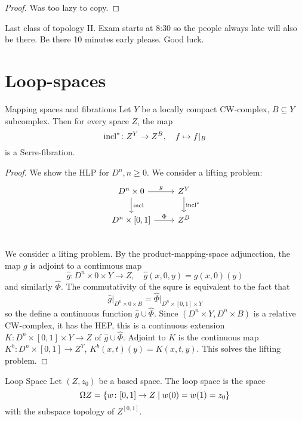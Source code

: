 \documentclass[language=english]{TemplateLecture}
\begin{document}
\begin{proof}
    Was too lazy to copy.
\end{proof}

Last class of topology II. Exam starts at 8:30 so the people always late will also be there. Be there 10 minutes early please. Good luck.

\section{Loop-spaces}

\begin{thm}{Mapping spaces and fibrations}{}
    Let \(Y\) be a locally compact CW-complex, \(B\subseteq Y\) subcomplex. Then for every space \(Z\), the map
    \[\operatorname{incl}^*\colon Z^Y \to Z^B, \quad f \mapsto f\rvert_B\]
    is a Serre-fibration.
\end{thm}

\begin{proof}
    We show the HLP for \(D^n, n \geq 0\). We consider a lifting problem:
    \[\begin{tikzcd}
        D^n \times 0 \ar[d, "\incl"] \ar[r, "g"] & Z^Y \ar[d, "\incl^*"] \\
        D^n \times [0,1] \ar[r, "\Phi"] & Z^B \\
    \end{tikzcd}\]
    We consider a liting problem. By the product-mapping-space adjuncction, the map \(g\) is adjoint to a continuous map
    \[\hat g\colon D^n \times 0 \times Y \to Z, \quad \hat g(x,0,y) = g(x,0)(y)\]
    and similarly \(\hat \Phi\). The commutativity of the squre is equivalent to the fact that
    \[\hat g\rvert_{D^n \times 0 \times B} = \hat\Phi\rvert_{D^n \times [0,1] \times Y}\] so the define a continuous function \(\hat g\cup \hat \Phi\). Since \((D^n \times Y, D^n \times B)\) is a relative CW-complex, it has the HEP, this is a continuous extension \(K\colon D^n \times [0,1] \times Y \to Z\) of \(\hat g\cup \hat \Phi\). Adjoint to \(K\) is the continuous map \(K^b \colon D^n \times [0,1] \to Z^Y\), \(K^b(x,t)(y) = K(x,t,y)\). This solves the lifting problem.
\end{proof}

\begin{defi}{Loop Space}{}
    Let \((Z, z_0)\) be a based space. The loop space is the space
    \[\Omega Z= \{w\colon [0,1] \to Z \mid w(0) = w(1) = z_0\}\]
    with the subspace topology of \(Z^{[0,1]}\).
\end{defi}
\end{document}
